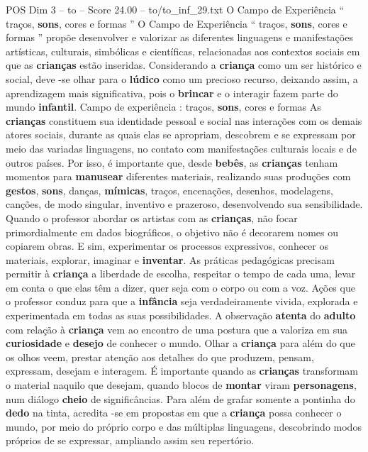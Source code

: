 \begin{textsample}{POS Dim 3 – to – Score 24.00 – to/to\_inf\_29.txt}  \label{ex:f3_pos_106}
O Campo de Experiência “ traços, \textbf{sons}, cores e formas ” O Campo de Experiência “ traços, \textbf{sons}, cores e formas ” propõe desenvolver e valorizar as diferentes linguagens e manifestações artísticas, culturais, simbólicas e científicas, relacionadas aos contextos sociais em que as \textbf{crianças} estão inseridas.
Considerando a \textbf{criança} como um ser histórico e social, deve -se olhar para o \textbf{lúdico} como um precioso recurso, deixando assim, a aprendizagem mais significativa, pois o \textbf{brincar} e o interagir fazem parte do mundo \textbf{infantil}.
Campo de experiência : traços, \textbf{sons}, cores e formas As \textbf{crianças} constituem sua identidade pessoal e social nas interações com os demais atores sociais, durante as quais elas se apropriam, descobrem e se expressam por meio das variadas linguagens, no contato com manifestações culturais locais e de outros países.
Por isso, é importante que, desde \textbf{bebês}, as \textbf{crianças} tenham momentos para \textbf{manusear} diferentes materiais, realizando suas produções com \textbf{gestos}, \textbf{sons}, danças, \textbf{mímicas}, traços, encenações, desenhos, modelagens, canções, de modo singular, inventivo e prazeroso, desenvolvendo sua sensibilidade.
Quando o professor abordar os artistas com as \textbf{crianças}, não focar primordialmente em dados biográficos, o objetivo não é decorarem nomes ou copiarem obras.
E sim, experimentar os processos expressivos, conhecer os materiais, explorar, imaginar e \textbf{inventar}.
As práticas pedagógicas precisam permitir à \textbf{criança} a liberdade de escolha, respeitar o tempo de cada uma, levar em conta o que elas têm a dizer, quer seja com o corpo ou com a voz.
Ações que o professor conduz para que a \textbf{infância} seja verdadeiramente vivida, explorada e experimentada em todas as suas possibilidades.
A observação \textbf{atenta} do \textbf{adulto} com relação à \textbf{criança} vem ao encontro de uma postura que a valoriza em sua \textbf{curiosidade} e \textbf{desejo} de conhecer o mundo.
Olhar a \textbf{criança} para além do que os olhos veem, prestar atenção aos detalhes do que produzem, pensam, expressam, desejam e interagem.
É importante quando as \textbf{crianças} transformam o material naquilo que desejam, quando blocos de \textbf{montar} viram \textbf{personagens}, num diálogo \textbf{cheio} de significâncias.
Para além de grafar somente a pontinha do \textbf{dedo} na tinta, acredita -se em propostas em que a \textbf{criança} possa conhecer o mundo, por meio do próprio corpo e das múltiplas linguagens, descobrindo modos próprios de se expressar, ampliando assim seu repertório.

\end{textsample}
